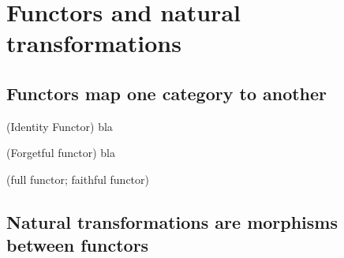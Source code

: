 
\section{Functors and natural transformations}

\subsection{Functors map one category to another}

\begin{example}{(Identity Functor)}
bla
\end{example}
\begin{example}{(Forgetful functor)}
bla
\end{example}

\begin{definition}{(full functor; faithful functor)}

\end{definition}

\subsection{Natural transformations are morphisms between functors}